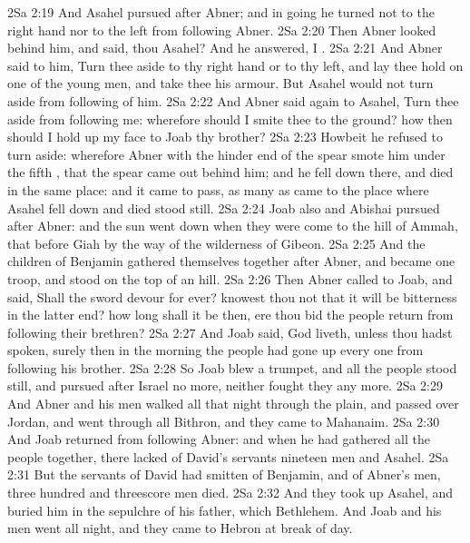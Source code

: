 \vs 2Sa 2:19 And Asahel pursued after Abner; and in going he turned not to the right hand nor to the left from following Abner.
\vs 2Sa 2:20 Then Abner looked behind him, and said,  thou Asahel? And he answered, I .
\vs 2Sa 2:21 And Abner said to him, Turn thee aside to thy right hand or to thy left, and lay thee hold on one of the young men, and take thee his armour. But Asahel would not turn aside from following of him.
\vs 2Sa 2:22 And Abner said again to Asahel, Turn thee aside from following me: wherefore should I smite thee to the ground? how then should I hold up my face to Joab thy brother?
\vs 2Sa 2:23 Howbeit he refused to turn aside: wherefore Abner with the hinder end of the spear smote him under the fifth , that the spear came out behind him; and he fell down there, and died in the same place: and it came to pass,  as many as came to the place where Asahel fell down and died stood still.
\vs 2Sa 2:24 Joab also and Abishai pursued after Abner: and the sun went down when they were come to the hill of Ammah, that  before Giah by the way of the wilderness of Gibeon.
\vs 2Sa 2:25 And the children of Benjamin gathered themselves together after Abner, and became one troop, and stood on the top of an hill.
\vs 2Sa 2:26 Then Abner called to Joab, and said, Shall the sword devour for ever? knowest thou not that it will be bitterness in the latter end? how long shall it be then, ere thou bid the people return from following their brethren?
\vs 2Sa 2:27 And Joab said,  God liveth, unless thou hadst spoken, surely then in the morning the people had gone up every one from following his brother.
\vs 2Sa 2:28 So Joab blew a trumpet, and all the people stood still, and pursued after Israel no more, neither fought they any more.
\vs 2Sa 2:29 And Abner and his men walked all that night through the plain, and passed over Jordan, and went through all Bithron, and they came to Mahanaim.
\vs 2Sa 2:30 And Joab returned from following Abner: and when he had gathered all the people together, there lacked of David's servants nineteen men and Asahel.
\vs 2Sa 2:31 But the servants of David had smitten of Benjamin, and of Abner's men,  three hundred and threescore men died.
\vs 2Sa 2:32 And they took up Asahel, and buried him in the sepulchre of his father, which  Bethlehem. And Joab and his men went all night, and they came to Hebron at break of day.
